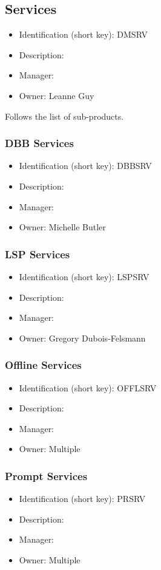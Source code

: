 \subsection{Services}\label{sect:DMSRV}
\begin{itemize}
\item Identification (short key): DMSRV
\item Description: 
\item Manager: 
\item Owner: Leanne Guy
\end{itemize}

Follows the list of sub-products.\subsubsection{DBB Services}\label{sect:DBBSRV}
\begin{itemize}
\item Identification (short key): DBBSRV
\item Description: 
\item Manager: 
\item Owner: Michelle Butler
\end{itemize}

\subsubsection{LSP Services}\label{sect:LSPSRV}
\begin{itemize}
\item Identification (short key): LSPSRV
\item Description: 
\item Manager: 
\item Owner: Gregory Dubois-Felsmann
\end{itemize}

\subsubsection{Offline Services}\label{sect:OFFLSRV}
\begin{itemize}
\item Identification (short key): OFFLSRV
\item Description: 
\item Manager: 
\item Owner: Multiple
\end{itemize}

\subsubsection{Prompt Services}\label{sect:PRSRV}
\begin{itemize}
\item Identification (short key): PRSRV
\item Description: 
\item Manager: 
\item Owner: Multiple
\end{itemize}

